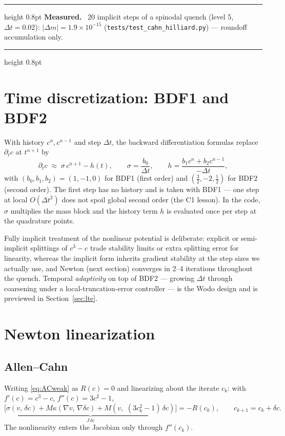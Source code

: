 \documentclass[11pt]{article}
\newenvironment{measured}{%
  \par\medskip\noindent\begin{minipage}{\linewidth}
  \hrule height 0.8pt \smallskip
  \textbf{Measured.}\ }{%
  \smallskip\hrule height 0.8pt \end{minipage}\par\medskip}
\newcommand{\ip}[2]{\left(#1,\,#2\right)}
\begin{document}
\begin{measured}
20 implicit steps of a spinodal quench (level 5, $\Delta t = 0.02$):
$\lvert \Delta m \rvert = 1.9\times 10^{-15}$
(\texttt{tests/test\_cahn\_hilliard.py}) --- roundoff accumulation
only.
\end{measured}

\section{Time discretization: BDF1 and BDF2}

With history $c^n, c^{n-1}$ and step $\Delta t$, the backward
differentiation formulas replace $\partial_t c$ at $t^{n+1}$ by
\begin{equation}
  \partial_t c \;\approx\; \sigma\, c^{n+1} - h(t),
  \qquad
  \sigma = \frac{b_0}{\Delta t},
  \qquad
  h = \frac{b_1 c^{n} + b_2 c^{n-1}}{-\Delta t},
\end{equation}
with $(b_0, b_1, b_2) = (1, -1, 0)$ for BDF1 (first order) and
$(\tfrac32, -2, \tfrac12)$ for BDF2 (second order). The first step has
no history and is taken with BDF1 --- one step at local
$O(\Delta t^2)$ does not spoil global second order (the C1 lesson).
In the code, $\sigma$ multiplies the mass block and the history term
$h$ is evaluated once per step at the quadrature points.

Fully implicit treatment of the nonlinear potential is deliberate:
explicit or semi-implicit splittings of $c^3-c$ trade stability limits
or extra splitting error for linearity, whereas the implicit form
inherits gradient stability at the step sizes we actually use, and
Newton (next section) converges in 2--4 iterations throughout the
quench. Temporal \emph{adaptivity} on top of BDF2 --- growing
$\Delta t$ through coarsening under a local-truncation-error controller
--- is the Wodo design \cite{wodo2011} and is previewed in
Section~\ref{sec:lte}.

\section{Newton linearization}

\subsection{Allen--Cahn}

Writing \eqref{eq:ACweak} as $R(c)=0$ and linearizing about the iterate
$c_k$: with $f'(c) = c^3 - c$, $f''(c) = 3c^2 - 1$,
\begin{equation}
  \underbrace{\Big[ \sigma \ip{v}{\delta c}
  + M\kappa \ip{\nabla v}{\nabla \delta c}
  + M \ip{v}{\,(3c_k^2-1)\,\delta c} \Big]}_{J\,\delta c}
  = -R(c_k),
  \qquad c_{k+1} = c_k + \delta c .
\end{equation}
The nonlinearity enters the Jacobian only through $f''(c_k)$.
\end{document}
